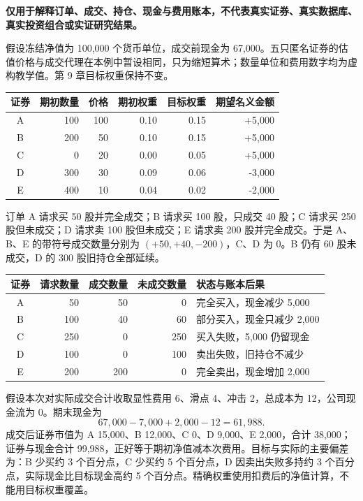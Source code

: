 \begin{casebox}
\textbf{仅用于解释订单、成交、持仓、现金与费用账本，不代表真实证券、真实数据库、真实投资组合或实证研究结果。}

假设冻结净值为 100,000 个货币单位，成交前现金为 67,000。五只匿名证券的估值价格与成交代理在本例中暂设相同，只为缩短算术；数量单位和费用数字均为虚构教学值。第 9 章目标权重保持不变。

\begin{center}
\footnotesize
\begin{tabular}{c r r r r r}
  \toprule
  证券 & 期初数量 & 价格 & 期初权重 & 目标权重 & 期望名义金额 \\
  \midrule
  A & 100 & 100 & 0.10 & 0.15 & +5,000 \\
  B & 200 & 50  & 0.10 & 0.15 & +5,000 \\
  C & 0   & 20  & 0.00 & 0.05 & +5,000 \\
  D & 300 & 30  & 0.09 & 0.06 & -3,000 \\
  E & 400 & 10  & 0.04 & 0.02 & -2,000 \\
  \bottomrule
\end{tabular}
\end{center}

订单 A 请求买 50 股并完全成交；B 请求买 100 股，只成交 40 股；C 请求买 250 股但未成交；D 请求卖 100 股但未成交；E 请求卖 200 股并完全成交。于是 A、B、E 的带符号成交数量分别为 \((+50,+40,-200)\)，C、D 为 0。B 仍有 60 股未成交，D 的 300 股旧持仓全部延续。

\begin{center}
\footnotesize
\begin{tabular}{c r r r l}
  \toprule
  证券 & 请求数量 & 成交数量 & 未成交数量 & 状态与账本后果 \\
  \midrule
  A & 50 & 50 & 0 & 完全买入，现金减少 5,000 \\
  B & 100 & 40 & 60 & 部分买入，现金只减少 2,000 \\
  C & 250 & 0 & 250 & 买入失败，5,000 仍留现金 \\
  D & 100 & 0 & 100 & 卖出失败，旧持仓不减少 \\
  E & 200 & 200 & 0 & 完全卖出，现金增加 2,000 \\
  \bottomrule
\end{tabular}
\end{center}

假设本次对实际成交合计收取显性费用 6、滑点 4、冲击 2，总成本为 12，公司现金流为 0。期末现金为
\[
67{,}000-7{,}000+2{,}000-12=61{,}988.
\]
成交后证券市值为 A 15,000、B 12,000、C 0、D 9,000、E 2,000，合计 38,000；证券与现金合计 99,988，正好等于期初净值减本次费用。目标与实际的主要偏差为：B 少买约 3 个百分点，C 少买约 5 个百分点，D 因卖出失败多持约 3 个百分点，实际现金比目标现金高约 5 个百分点。精确权重使用扣费后的净值计算，不能用目标权重覆盖。
\end{casebox}

